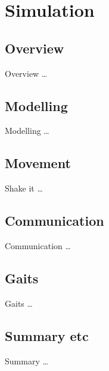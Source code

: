 \chapter{Simulation} \label{Chapter:Simulation}

\section{Overview}
Overview \dots

\section{Modelling}
Modelling \dots

\section{Movement}
Shake it \dots

\section{Communication}
Communication \dots

\section{Gaits}
Gaits \dots

\section{Summary etc}
Summary \dots